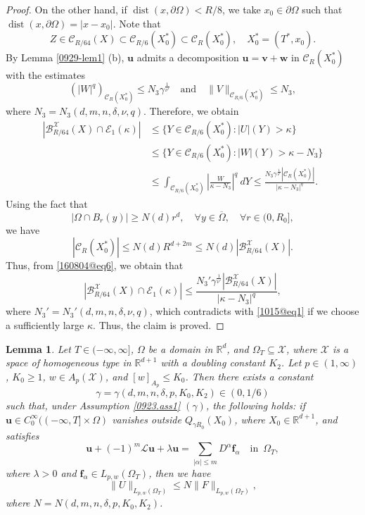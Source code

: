 \documentclass[reqno]{amsart}
\numberwithin{equation}{section}
\theoremstyle{plain}
\newtheorem{lemma}[theorem]{Lemma}
\theoremstyle{definition}
\theoremstyle{remark}
\begin{document}
\begin{proof}
On the other hand, if $\operatorname{dist} (x, \partial \Omega)<R/8$,  we take $x_0\in \partial \Omega$ such that $\operatorname{dist} (x,\partial \Omega)=|x-x_0|$.
Note that
\[
Z\in {\mathcal{C}}_{R/64}(X)\subset {\mathcal{C}}_{R/6}(X_0^*)\subset {\mathcal{C}}_R(X_0^*), \quad X_0^*=(T^*,x_0).
\]
By Lemma \ref{0929-lem1} (b), ${\boldsymbol{u}}$ admits a decomposition ${\boldsymbol{u}}={\boldsymbol{v}}+{\boldsymbol{w}}$ in ${\mathcal{C}}_R(X_0^*)$ with the estimates
\[
(|W|^{q})_{{\mathcal{C}}_R(X_0^*)}\le N_3\gamma^{\frac{1}{\nu'}} \quad \text{and}\quad \|V\|_{{\mathcal{C}}_{R/6}(X_0^*)}\le N_3,
\]
where $N_3=N_3(d,m,n,\delta,\nu,q)$.
Therefore, we obtain 
\begin{align}
\nonumber
|{\mathcal{B}}_{R/64}^{\mathcal{X}}(X)\cap {\mathcal{E}}_1(\kappa)|&\le\{Y\in {\mathcal{C}}_{R/6}(X^*_0):|U|(Y)>\kappa\}\\
\nonumber
&\le \{Y\in {\mathcal{C}}_{R/6}(X^*_0):|W|(Y)>\kappa-N_3\}\\
\label{160804@eq6}
&\le \int_{{\mathcal{C}}_{R/6}(X_0^*)}\left|\frac{W}{\kappa-N_3}\right|^q\ dY\le \frac{N_3\gamma^{\frac{1}{\nu'}}|{\mathcal{C}}_R(X_0^*)|}{|\kappa-N_3|^q}.
\end{align}
Using the fact that 
\begin{equation}		\label{160804@eq1}
|\Omega\cap B_r(y)|\ge N(d)r^d, \quad \forall y\in \overline{\Omega}, \quad \forall r\in (0,R_0],
\end{equation}
we have 
$$
|{\mathcal{C}}_R(X^*_0)|\le N(d)R^{d+2m} \le N(d)|{\mathcal{B}}_{R/64}^{\mathcal{X}}(X)|.
$$
Thus, from \eqref{160804@eq6}, we obtain that 
$$
|{\mathcal{B}}_{R/64}^{\mathcal{X}}(X)\cap {\mathcal{E}}_1(\kappa)|\le \frac{N_3'\gamma^{\frac{1}{\nu'}}|{\mathcal{B}}_{R/64}^{\mathcal{X}}(X)|}{|\kappa-N_3|^q},
$$
where $N_3'=N_3'(d,m,n,\delta,\nu,q)$, which contradicts with \eqref{1015@eq1} if we choose a sufficiently large $\kappa$.
Thus, the claim is proved.
\end{proof}

\begin{lemma}		\label{1016@lem5}
Let $T\in (-\infty,\infty]$, $\Omega$  be a domain  in ${\mathbb{R}}^d$, and $\Omega_T\subseteq {\mathcal{X}}$, where 
${\mathcal{X}}$ is  a space of homogeneous type in ${\mathbb{R}}^{d+1}$ with a doubling constant $K_2$.
Let $p\in (1,\infty)$, $K_0\ge 1$, $w\in A_p({\mathcal{X}})$, and   $[w]_{A_p}\le K_0$.
Then there exists a constant 
\[
\gamma=\gamma(d,m,n,\delta,p, K_0,K_2)\in (0,1/6)
\]
such that, under  Assumption \ref{0923.ass1} $(\gamma)$, the following holds:
if ${\boldsymbol{u}}\in C^\infty_0((-\infty,T]\times \Omega)$ vanishes outside $Q_{\gamma R_0}(X_0)$, where $X_0\in {\mathbb{R}}^{d+1}$, and satisfies 
\[
{\boldsymbol{u}}+(-1)^m {\mathcal{L}}{\boldsymbol{u}}+\lambda{\boldsymbol{u}}=\sum_{|\alpha| \le m}D^\alpha {\boldsymbol{f}}_\alpha \quad \text{in }\, \Omega_T,
\]
where $\lambda>0$ and ${\boldsymbol{f}}_\alpha\in L_{p,w}( \Omega_T)$, then we have 
\begin{equation}		\label{1013@eq2}
\|U\|_{L_{p,w}( \Omega_T)}\le N\|F\|_{L_{p,w}(\Omega_T)},
\end{equation}
where  $N=N(d,m,n,\delta,p,K_0,K_2)$.
\end{lemma}
\end{document}
